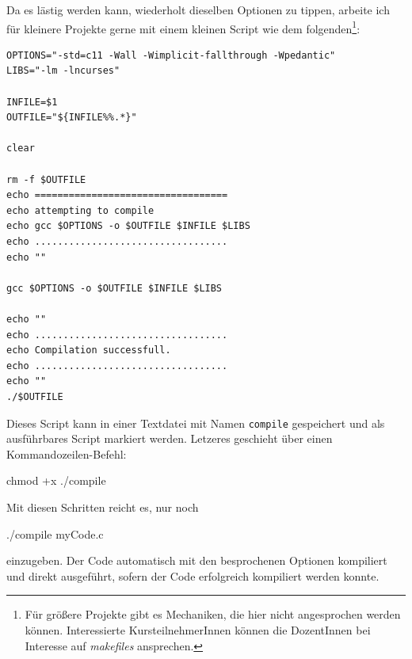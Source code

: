 \begin{hintbox}
Da es lästig werden kann, wiederholt dieselben Optionen zu tippen, arbeite ich für kleinere Projekte gerne mit einem kleinen Script wie dem folgenden\footnote{Für größere Projekte gibt es Mechaniken, die hier nicht angesprochen werden können. Interessierte KursteilnehmerInnen können die DozentInnen bei Interesse auf \emph{makefiles} ansprechen.}:
\begin{codebox}
\begin{verbatim}
OPTIONS="-std=c11 -Wall -Wimplicit-fallthrough -Wpedantic"
LIBS="-lm -lncurses"

INFILE=$1
OUTFILE="${INFILE%%.*}"

clear

rm -f $OUTFILE
echo ==================================
echo attempting to compile
echo gcc $OPTIONS -o $OUTFILE $INFILE $LIBS
echo ..................................
echo ""

gcc $OPTIONS -o $OUTFILE $INFILE $LIBS

echo ""
echo ..................................
echo Compilation successfull.
echo ..................................
echo ""
./$OUTFILE
\end{verbatim}
\end{codebox}

Dieses Script kann \eg in einer Textdatei mit Namen \texttt{compile} gespeichert und als ausführbares Script markiert werden. Letzeres geschieht über einen Kommandozeilen-Befehl:
\begin{cmdbox}
chmod +x ./compile
\end{cmdbox}

Mit diesen Schritten reicht es, nur noch
\begin{cmdbox}
./compile myCode.c
\end{cmdbox}
einzugeben. Der Code automatisch mit den besprochenen Optionen kompiliert und direkt ausgeführt, sofern der Code erfolgreich kompiliert werden konnte.
\end{hintbox}
